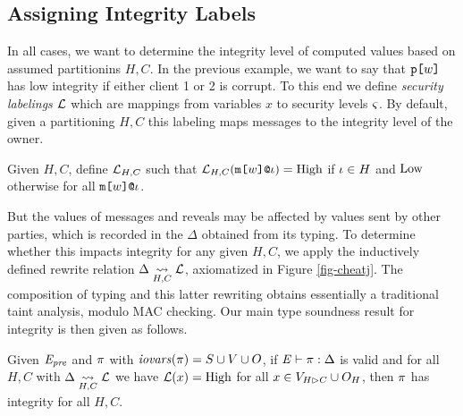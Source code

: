\cheatjfig

\subsection{Assigning Integrity Labels}

In all cases, we want to determine the integrity level of computed
values based on assumed partitionins $H,C$. In the previous example,
we want to say that $\texttt{p[}w\texttt{]}$ has low integrity if either client 1 or
2 is corrupt.  To this end we define \emph{security labelings}
$\mathcal{L}$ which are mappings from variables $x$ to security levels
$\varsigma$. By default, given a partitioning $H,C$ this labeling maps
messages to the integrity level of the owner.
\begin{definition}  
  Given $H,C$,
  define $\mathcal{L}_{H,C}$ such that $\mathcal{L}_{H,C}(\texttt{m[}w\texttt{]}\texttt{@}\iota ) = \mathrm{High}$
  if $\iota \in H$  and $\mathrm{Low}$
  otherwise for all $\texttt{m[}w\texttt{]}\texttt{@}\iota$.
\end{definition}
But the values of messages and reveals may be affected by values sent
by other parties, which is recorded in the $\Delta$ obtained from its
typing. To determine whether this impacts integrity for any given
$H,C$, we apply the inductively defined rewrite relation
$\Delta \underset{H,C}{\leadsto} \mathcal{L}$, axiomatized in Figure
\ref{fig-cheatj}. The composition of typing and this latter rewriting
obtains essentially a traditional taint analysis, modulo MAC checking.
Our main type soundness result for integrity is then given as follows.
\begin{theorem}
  \label{theorem-ipj}
  Given  $\mathit{E}_{\mathit{pre}}$ and $\pi$ with
  $\mathit{iovars}(\pi) = S \cup V \cup O$, if
  $\mathit{E} \vdash \pi : \Delta$ is valid
  and for all $H,C$ with $\Delta \underset{H,C}{\leadsto} \mathcal{L}$ 
  we have $\mathcal{L}(x) = \mathrm{High}$ for all $x \in V_{H \rhd C} \cup O_H$, then $\pi$
  has integrity for all $H,C$.
\end{theorem}
